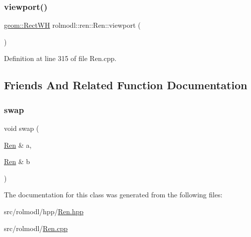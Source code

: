 \mbox{\label{classrolmodl_1_1blend_mode_1_1_ren_aad539cdeb1eb935c30c79ec15b1ef312}} 
\subsubsection{\texorpdfstring{viewport()}{viewport()}}
{\footnotesize\ttfamily \mbox{\hyperlink{structrolmodl_1_1geom_1_1_rect_w_h}{geom\+::\+Rect\+WH}} rolmodl\+::ren\+::\+Ren\+::viewport (\begin{DoxyParamCaption}{ }\end{DoxyParamCaption})\hspace{0.3cm}{\ttfamily [noexcept]}}



Definition at line 315 of file Ren.\+cpp.



\subsection{Friends And Related Function Documentation}
\mbox{\label{classrolmodl_1_1blend_mode_1_1_ren_ae62e12d00441a413d77930be0628f821}} 
\subsubsection{\texorpdfstring{swap}{swap}}
{\footnotesize\ttfamily void swap (\begin{DoxyParamCaption}\item[{\mbox{\hyperlink{classrolmodl_1_1blend_mode_1_1_ren}{Ren}} \&}]{a,  }\item[{\mbox{\hyperlink{classrolmodl_1_1blend_mode_1_1_ren}{Ren}} \&}]{b }\end{DoxyParamCaption})\hspace{0.3cm}{\ttfamily [friend]}}



The documentation for this class was generated from the following files\+:\begin{DoxyCompactItemize}
\item 
src/rolmodl/hpp/\mbox{\hyperlink{_ren_8hpp}{Ren.\+hpp}}\item 
src/rolmodl/\mbox{\hyperlink{_ren_8cpp}{Ren.\+cpp}}\end{DoxyCompactItemize}
